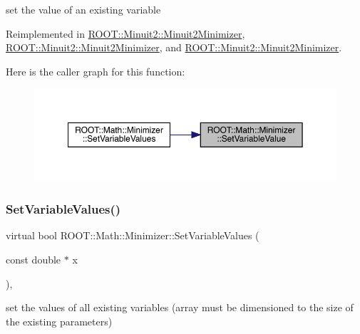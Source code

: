 set the value of an existing variable 



Reimplemented in \mbox{\hyperlink{classROOT_1_1Minuit2_1_1Minuit2Minimizer_a474e05b30c1227e9cc39fb597027f426}{R\+O\+O\+T\+::\+Minuit2\+::\+Minuit2\+Minimizer}}, \mbox{\hyperlink{classROOT_1_1Minuit2_1_1Minuit2Minimizer_a474e05b30c1227e9cc39fb597027f426}{R\+O\+O\+T\+::\+Minuit2\+::\+Minuit2\+Minimizer}}, and \mbox{\hyperlink{classROOT_1_1Minuit2_1_1Minuit2Minimizer_a474e05b30c1227e9cc39fb597027f426}{R\+O\+O\+T\+::\+Minuit2\+::\+Minuit2\+Minimizer}}.

Here is the caller graph for this function\+:
\nopagebreak
\begin{figure}[H]
\begin{center}
\leavevmode
\includegraphics[width=350pt]{dc/dc4/classROOT_1_1Math_1_1Minimizer_a47e9a16c7a0b4ecfe769ee4be048d5c3_icgraph}
\end{center}
\end{figure}
\mbox{\label{classROOT_1_1Math_1_1Minimizer_ac8368efbd59da8e0b8bc0a0966309609}} 
\subsubsection{\texorpdfstring{SetVariableValues()}{SetVariableValues()}\hspace{0.1cm}{\footnotesize\ttfamily [1/3]}}
{\footnotesize\ttfamily virtual bool R\+O\+O\+T\+::\+Math\+::\+Minimizer\+::\+Set\+Variable\+Values (\begin{DoxyParamCaption}\item[{const double $\ast$}]{x }\end{DoxyParamCaption})\hspace{0.3cm}{\ttfamily [inline]}, {\ttfamily [virtual]}}



set the values of all existing variables (array must be dimensioned to the size of the existing parameters) 



